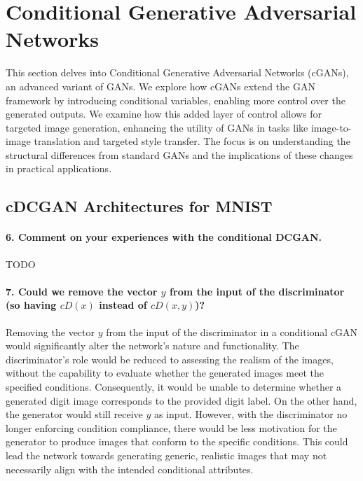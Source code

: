 
\section{Conditional Generative Adversarial Networks}

This section delves into Conditional Generative Adversarial Networks (cGANs), an advanced variant of GANs. We explore how cGANs extend the GAN framework by introducing conditional variables, enabling more control over the generated outputs. We examine how this added layer of control allows for targeted image generation, enhancing the utility of GANs in tasks like image-to-image translation and targeted style transfer. The focus is on understanding the structural differences from standard GANs and the implications of these changes in practical applications.

\subsection{cDCGAN Architectures for MNIST}

\paragraph*{6. Comment on your experiences with the conditional DCGAN.}

TODO 


\paragraph*{7. Could we remove the vector $y$ from the input of the discriminator (so having $cD(x)$ instead of $cD(x, y)$)?}

Removing the vector $y$ from the input of the discriminator in a conditional cGAN would significantly alter the network's nature and functionality. The discriminator's role would be reduced to assessing the realism of the images, without the capability to evaluate whether the generated images meet the specified conditions. Consequently, it would be unable to determine whether a generated digit image corresponds to the provided digit label. On the other hand, the generator would still receive $y$ as input. However, with the discriminator no longer enforcing condition compliance, there would be less motivation for the generator to produce images that conform to the specific conditions. This could lead the network towards generating generic, realistic images that may not necessarily align with the intended conditional attributes.

